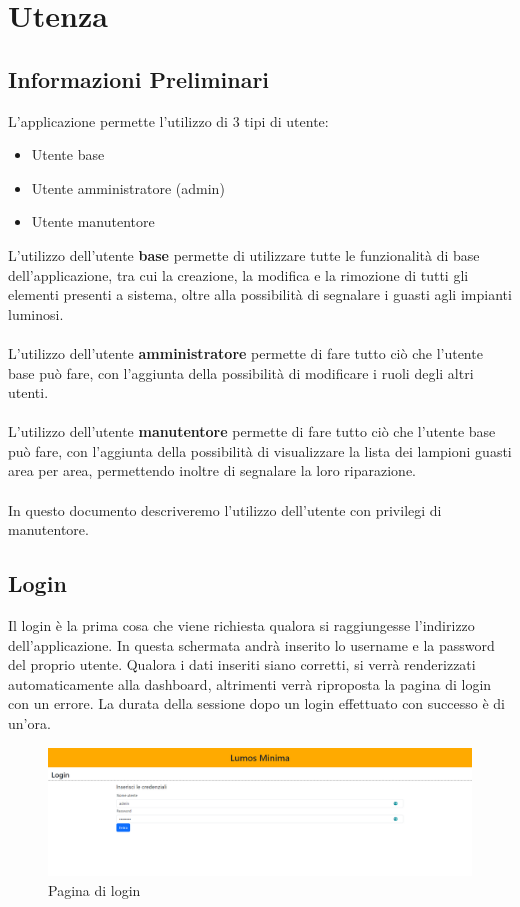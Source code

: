 \documentclass[a4paper, 12pt]{article}
\begin{document}
\newpage
\section{Utenza}
\subsection{Informazioni Preliminari}
L'applicazione permette l'utilizzo di 3 tipi di utente:
\begin{itemize}
    \item Utente base
    \item Utente amministratore (admin)
    \item Utente manutentore
\end{itemize}
L'utilizzo dell'utente \textbf{base} permette di utilizzare tutte le funzionalità di base dell'applicazione, tra cui la creazione, la modifica e la rimozione di tutti gli elementi presenti a sistema, oltre alla possibilità di segnalare i guasti agli impianti luminosi.\\ \\
L'utilizzo dell'utente \textbf{amministratore} permette di fare tutto ciò che l'utente base può fare, con l'aggiunta della possibilità di modificare i ruoli degli altri utenti.\\ \\
L'utilizzo dell'utente \textbf{manutentore} permette di fare tutto ciò che l'utente base può fare, con l'aggiunta della possibilità di visualizzare la lista dei lampioni guasti area per area, permettendo inoltre di segnalare la loro riparazione.\\\\
In questo documento descriveremo l'utilizzo dell'utente con privilegi di manutentore.
\subsection{Login}
Il login è la prima cosa che viene richiesta qualora si raggiungesse l'indirizzo dell'applicazione. In questa schermata andrà inserito lo username e la password del proprio utente. Qualora i dati inseriti siano corretti, si verrà renderizzati automaticamente alla dashboard, altrimenti verrà riproposta la pagina di login con un errore. La durata della sessione dopo un login effettuato con successo è di un'ora.
\begin{figure}[H]
    \centering
    \includegraphics[width=\textwidth]{login}
    \caption{Pagina di login}
\end{figure}
\end{document}
